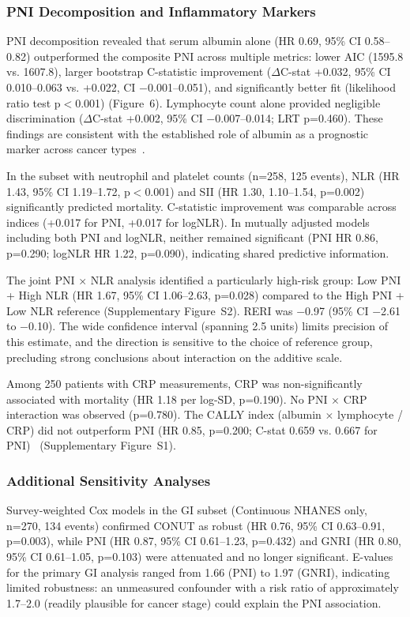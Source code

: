 \documentclass[review]{elsarticle}
\begin{document}
\subsubsection{PNI Decomposition and Inflammatory Markers}

PNI decomposition revealed that serum albumin alone (HR 0.69, 95\% CI 0.58--0.82) outperformed the composite PNI across multiple metrics: lower AIC (1595.8 vs. 1607.8), larger bootstrap C-statistic improvement ($\Delta$C-stat +0.032, 95\% CI 0.010--0.063 vs. +0.022, CI $-$0.001--0.051), and significantly better fit (likelihood ratio test p$<$0.001) (Figure~6). Lymphocyte count alone provided negligible discrimination ($\Delta$C-stat +0.002, 95\% CI $-$0.007--0.014; LRT p=0.460). These findings are consistent with the established role of albumin as a prognostic marker across cancer types~\cite{gupta2010}.

In the subset with neutrophil and platelet counts (n=258, 125 events), NLR (HR 1.43, 95\% CI 1.19--1.72, p$<$0.001) and SII (HR 1.30, 1.10--1.54, p=0.002) significantly predicted mortality. C-statistic improvement was comparable across indices (+0.017 for PNI, +0.017 for logNLR). In mutually adjusted models including both PNI and logNLR, neither remained significant (PNI HR 0.86, p=0.290; logNLR HR 1.22, p=0.090), indicating shared predictive information.

The joint PNI $\times$ NLR analysis identified a particularly high-risk group: Low PNI + High NLR (HR 1.67, 95\% CI 1.06--2.63, p=0.028) compared to the High PNI + Low NLR reference (Supplementary Figure~S2). RERI was $-$0.97 (95\% CI $-$2.61 to $-$0.10). The wide confidence interval (spanning 2.5 units) limits precision of this estimate, and the direction is sensitive to the choice of reference group, precluding strong conclusions about interaction on the additive scale.

Among 250 patients with CRP measurements, CRP was non-significantly associated with mortality (HR 1.18 per log-SD, p=0.190). No PNI $\times$ CRP interaction was observed (p=0.780). The CALLY index (albumin $\times$ lymphocyte / CRP) did not outperform PNI (HR 0.85, p=0.200; C-stat 0.659 vs. 0.667 for PNI)~\cite{yangm2023} (Supplementary Figure~S1).

\subsubsection{Additional Sensitivity Analyses}

Survey-weighted Cox models in the GI subset (Continuous NHANES only, n=270, 134 events) confirmed CONUT as robust (HR 0.76, 95\% CI 0.63--0.91, p=0.003), while PNI (HR 0.87, 95\% CI 0.61--1.23, p=0.432) and GNRI (HR 0.80, 95\% CI 0.61--1.05, p=0.103) were attenuated and no longer significant. E-values for the primary GI analysis ranged from 1.66 (PNI) to 1.97 (GNRI), indicating limited robustness: an unmeasured confounder with a risk ratio of approximately 1.7--2.0 (readily plausible for cancer stage) could explain the PNI association.
\end{document}
